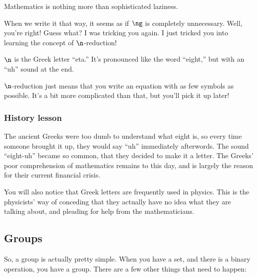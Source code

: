 Mathematics is nothing more than sophisticated laziness.

When we write it that way, it seems as if $\ng$ is completely unnecessary. Well,
you're right! Guess what? I was tricking you again. I just tricked you into
learning the concept of $\n$-reduction! 

$\n$ is the Greek letter ``eta.'' It's pronounced like the word ``eight,'' but
with an ``uh'' sound at the end. 

$\n$-reduction just means that you write an equation with as few symbols as
possible. It's a bit more complicated than that, but you'll pick it up later!

\subsubsection{History lesson}

The ancient Greeks were too dumb to understand what eight is, so every time
someone brought it up, they would say ``uh'' immediately afterwords. The sound
``eight-uh'' became so common, that they decided to make it a letter. The
Greeks' poor comprehension of mathematics remains to this day, and is largely
the reason for their current financial crisis.

You will also notice that Greek letters are frequently used in physics. This is
the physicists' way of conceding that they actually have no idea what they are
talking about, and pleading for help from the mathematicians.

\subsection{Groups}

So, a group is actually pretty simple. When you have a set, and there is a
binary operation, you have a group. There are a few other things that need
to happen:

